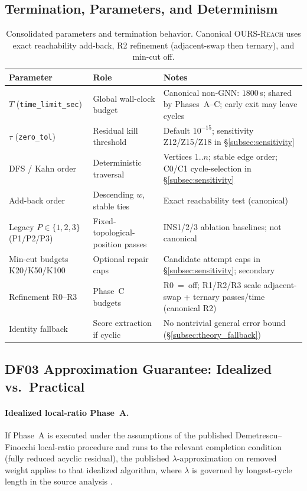 \documentclass{article}
\begin{document}
\subsection{Termination, Parameters, and Determinism}
\label{subsec:parameters}
\begin{table}[H]
\centering
\small
\begin{tabular}{@{}llp{6.6cm}@{}}
\toprule
\textbf{Parameter} & \textbf{Role} & \textbf{Notes} \\
\midrule
$T$ (\texttt{time\_limit\_sec}) & Global wall-clock budget & Canonical non-GNN: $1800$\,s; shared by Phases~A--C; early exit may leave cycles \\
$\tau$ (\texttt{zero\_tol}) & Residual kill threshold & Default $10^{-15}$; sensitivity Z12/Z15/Z18 in \S\ref{subsec:sensitivity} \\
DFS / Kahn order & Deterministic traversal & Vertices $1..n$; stable edge order; C0/C1 cycle-selection in \S\ref{subsec:sensitivity} \\
Add-back order & Descending $w$, stable ties & Exact reachability test (canonical) \\
Legacy $P\in\{1,2,3\}$ (P1/P2/P3) & Fixed-topological-position passes & INS1/2/3 ablation baselines; not canonical \\
Min-cut budgets K20/K50/K100 & Optional repair caps & Candidate attempt caps in \S\ref{subsec:sensitivity}; secondary \\
Refinement R0--R3 & Phase~C budgets & R0~=~off; R1/R2/R3 scale adjacent-swap + ternary passes/time (canonical R2) \\
Identity fallback & Score extraction if cyclic & No nontrivial general error bound (\S\ref{subsec:theory_fallback}) \\
\bottomrule
\end{tabular}
\caption{Consolidated parameters and termination behavior. Canonical \textsc{OURS-Reach} uses exact reachability add-back, R2 refinement (adjacent-swap then ternary), and min-cut off.}
\label{tab:parameters}
\end{table}

\subsection{DF03 Approximation Guarantee: Idealized vs.\ Practical}
\label{subsec:theory_df03}
\paragraph{Idealized local-ratio Phase~A.}
If Phase~A is executed under the assumptions of the published Demetrescu--Finocchi local-ratio procedure and runs to the relevant completion condition (fully reduced acyclic residual), the published $\lambda$-approximation on removed weight applies to that idealized algorithm, where $\lambda$ is governed by longest-cycle length in the source analysis \citet{CI03}.
\end{document}
